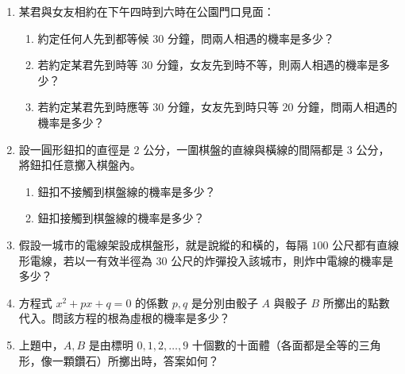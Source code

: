 \begin{enumerate}[label=\textbf{\arabic*.}]
  \item 某君與女友相約在下午四時到六時在公園門口見面：
  \begin{enumerate}[label=(\arabic*)]
    \item 約定任何人先到都等候 $30$ 分鐘，問兩人相遇的機率是多少？
    \item 若約定某君先到時等 $30$ 分鐘，女友先到時不等，則兩人相遇的機率是多少？
    \item 若約定某君先到時應等 $30$ 分鐘，女友先到時只等 $20$ 分鐘，問兩人相遇的機率是多少？
  \end{enumerate}

  \item 設一圓形鈕扣的直徑是 $2$ 公分，一圍棋盤的直線與橫線的間隔都是 $3$ 公分，將鈕扣任意擲入棋盤內。
  \begin{enumerate}[label=(\arabic*)]
    \item 鈕扣不接觸到棋盤線的機率是多少？
    \item 鈕扣接觸到棋盤線的機率是多少？
  \end{enumerate}

  \item 假設一城市的電線架設成棋盤形，就是說縱的和橫的，每隔 $100$ 公尺都有直線形電線，若以一有效半徑為 $30$ 公尺的炸彈投入該城市，則炸中電線的機率是多少？

  \item 方程式 $x^2 + px + q = 0$ 的係數 $p, q$ 是分別由骰子 $A$ 與骰子 $B$ 所擲出的點數代入。問該方程的根為虛根的機率是多少？

  \item 上題中，$A, B$ 是由標明 $0, 1, 2, \ldots, 9$ 十個數的十面體（各面都是全等的三角形，像一顆鑽石）所擲出時，答案如何？
\end{enumerate}
